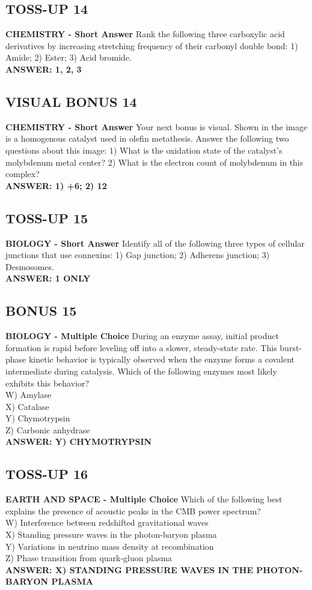 \documentclass{article}
\begin{document}
\subsection*{TOSS-UP 14}
\textbf{CHEMISTRY - Short Answer} Rank the following three carboxylic acid derivatives by increasing stretching frequency of their carbonyl double bond: 1) Amide; 2) Ester; 3) Acid bromide. \\
\textbf{ANSWER: 1, 2, 3}

\subsection*{VISUAL BONUS 14}
\textbf{CHEMISTRY - Short Answer} Your next bonus is visual. Shown in the image is a homogenous catalyst used in olefin metathesis. Answer the following two questions about this image:
1) What is the oxidation state of the catalyst's molybdenum metal center?
2) What is the electron count of molybdenum in this complex? \\
\textbf{ANSWER: 1) +6; 2) 12}

\subsection*{TOSS-UP 15}
\textbf{BIOLOGY - Short Answer} Identify all of the following three types of cellular junctions that use connexins: 1) Gap junction; 2) Adherens junction; 3) Desmosomes. \\
\textbf{ANSWER: 1 ONLY}

\subsection*{BONUS 15}
\textbf{BIOLOGY - Multiple Choice} During an enzyme assay, initial product formation is rapid before leveling off into a slower, steady-state rate. This burst-phase kinetic behavior is typically observed when the enzyme forms a covalent intermediate during catalysis. Which of the following enzymes most likely exhibits this behavior? \\
W) Amylase \\
X) Catalase \\
Y) Chymotrypsin \\
Z) Carbonic anhydrase \\
\textbf{ANSWER: Y) CHYMOTRYPSIN}

\subsection*{TOSS-UP 16}
\textbf{EARTH AND SPACE - Multiple Choice} Which of the following best explains the presence of acoustic peaks in the CMB power spectrum? \\
W) Interference between redshifted gravitational waves \\
X) Standing pressure waves in the photon-baryon plasma \\
Y) Variations in neutrino mass density at recombination \\
Z) Phase transition from quark-gluon plasma \\
\textbf{ANSWER: X) STANDING PRESSURE WAVES IN THE PHOTON-BARYON PLASMA}
\end{document}
